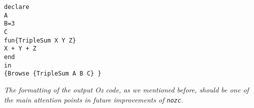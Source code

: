 \begin{lstlisting}[label={lst:compilation-a},title={Resulting \textit{Oz} code, demonstrating the successful compilation process}]
declare
A
B=3
C
fun{TripleSum X Y Z}
X + Y + Z
end
in
{Browse {TripleSum A B C} }
\end{lstlisting}
\textit{The formatting of the output \textit{Oz} code, as we mentioned before, should be one of the main attention points in future improvements of \texttt{nozc}.}
